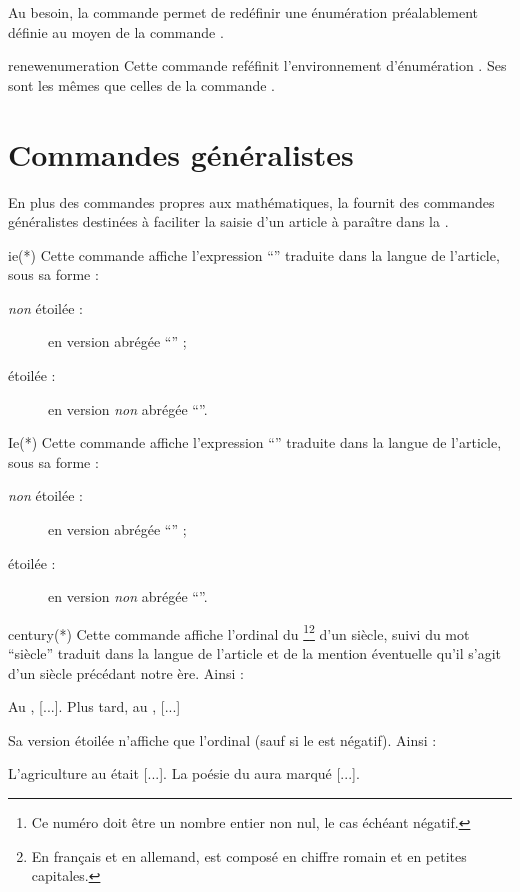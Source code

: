 \documentclass[english,nolocaltoc]{nwejmart}
\newtheorem[style=definition]{fait}
\newtheorem[title=expérience]{experience}
\newtheorem[title-plural=anneaux]{anneau}
\newtheorem[title=idéal,title-plural=idéaux]{ideal}
\begin{document}
Au besoin, la commande  permet de redéfinir une
énumération préalablement définie au moyen de la commande
.

\begin{docCommand}[doc new=2019-03-18]{renewenumeration}{}
  Cette commande reféfinit l'environnement d'énumération . Ses
   sont les mêmes que celles de la commande
  .
\end{docCommand}

\section{Commandes généralistes}
\label{sec:comm-gener}

En plus des commandes propres aux mathématiques, la \nwejmauthorcl{} fournit des
commandes généralistes destinées à faciliter la saisie d'un article à paraître
dans la \nwejm{}.

\begin{docCommand}{ie(*)}{}
  Cette commande affiche l'expression \enquote{\ie*{}} traduite dans la langue
  de l'article, sous sa forme :
  \begin{description}
  \item[\emph{non} étoilée :] en version abrégée \enquote{\ie{}} ;
  \item[étoilée :] en version \emph{non} abrégée \enquote{\ie*{}}.
  \end{description}
\end{docCommand}

\begin{docCommand}{Ie(*)}{}
  Cette commande affiche l'expression \enquote{\Ie*{}} traduite dans la langue
  de l'article, sous sa forme :
  \begin{description}
  \item[\emph{non} étoilée :] en version abrégée \enquote{\Ie{}} ;
  \item[étoilée :] en version \emph{non} abrégée \enquote{\Ie*{}}.
  \end{description}
\end{docCommand}

\begin{docCommand}{century(*)}{}
  Cette commande affiche l'ordinal du \footnote{Ce numéro doit être
    un nombre entier non nul, le cas échéant négatif.}\footnote{En français et en
    allemand,  est composé en chiffre romain et en petites
    capitales.} d'un siècle, suivi du mot \enquote{siècle} traduit dans la
  langue de l'article et de la mention éventuelle qu'il s'agit d'un siècle
  précédant notre ère. Ainsi :
\begin{bodycode}
Au , [...]. Plus tard, au , [...]
\end{bodycode}
  Sa version étoilée n'affiche que l'ordinal (sauf si le  est
  négatif). Ainsi :
\begin{bodycode}
L'agriculture au  était [...].
La poésie du  aura marqué [...].
\end{bodycode}
\end{docCommand}
\end{document}
